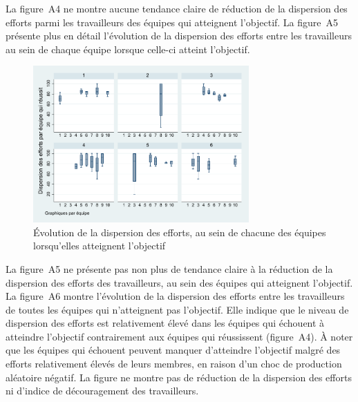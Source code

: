 \begin{Article}
\begin{refsection}[Lebourges]
\begin{appendices}
La figure~A4 ne montre aucune tendance claire de réduction de la
dispersion des efforts parmi les travailleurs des équipes qui atteignent
l'objectif.
La figure~A5 présente plus en détail l'évolution de la dispersion des
efforts entre les travailleurs au sein de chaque équipe lorsque celle-ci
atteint l'objectif.

\begin{figure}[h]
    \centering
    \caption{Évolution de la dispersion des efforts, au sein de chacune des équipes lorsqu'elles atteignent l'objectif}
    \includegraphics[height=6cm]{05_graphA5.pdf}
\end{figure}

La figure~A5 ne présente pas non plus de tendance claire à la
réduction de la dispersion des efforts des travailleurs, au sein des
équipes qui atteignent l'objectif.
La figure~A6 montre l'évolution de la dispersion des efforts entre
les travailleurs de toutes les équipes qui n'atteignent pas l'objectif.
Elle indique que le niveau de dispersion des efforts est relativement
élevé dans les équipes qui échouent à atteindre l'objectif contrairement
aux équipes qui réussissent (figure~A4). À noter que les équipes qui
échouent peuvent manquer d'atteindre l'objectif malgré des efforts
relativement élevés de leurs membres, en raison d'un choc de production
aléatoire négatif. La figure ne montre pas de réduction de la
dispersion des efforts ni d'indice de découragement des travailleurs.


\end{appendices}
\end{refsection}
\end{Article}
